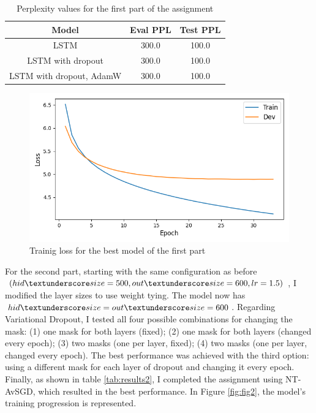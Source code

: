 \documentclass[a4paper]{article}
\begin{document}
\begin{table}[h]
  \centering
  \begin{tabular}{|c|c|c|}
    \hline
    \textbf{Model} & \textbf{Eval PPL} & \textbf{Test PPL} \\
    \hline
    LSTM & 300.0 & 100.0 \\
    LSTM with dropout & 300.0 & 100.0 \\
    LSTM with dropout, AdamW & 300.0 & 100.0 \\
    \hline
  \end{tabular}
  \caption{Perplexity values for the first part of the assignment}
  \label{tab:results1}

\end{table}

\begin{figure}[h]
  \includegraphics[width=\linewidth]{./images/plot_1_loss.png}
  \caption{Trainig loss for the best model of the first part}
  \label{fig:fig1}
\end{figure}


For the second part, starting with the same configuration as before \((hid \textunderscore size=500, out \textunderscore size=600, lr=1.5)\), I modified the layer sizes to use weight tying.
The model now has \(hid \textunderscore size=out \textunderscore size=600\).
Regarding Variational Dropout, I tested all four possible combinations for changing the mask: (1) one mask for both layers (fixed); (2) one mask for both layers (changed every epoch); (3) two masks (one per layer, fixed); (4) two masks (one per layer, changed every epoch). The best performance was achieved with the third option: using a different mask for each layer of dropout and changing it every epoch.
Finally, as shown in table \ref{tab:results2}, I completed the assignment using NT-AvSGD, which resulted in the best performance.
In Figure \ref{fig:fig2}, the model's training progression is represented.
\end{document}
